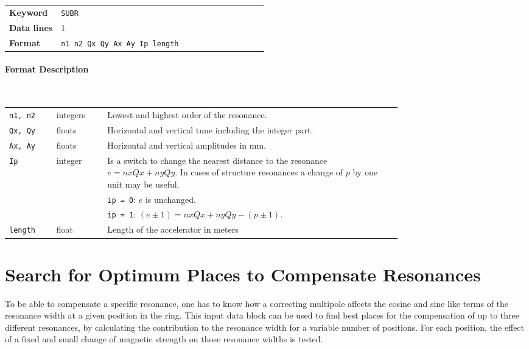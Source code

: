 \bigskip
\begin{tabular}{@{}lp{0.8\linewidth}}
    \textbf{Keyword}    & \texttt{SUBR} \\
    \textbf{Data lines} & 1 \\
    \textbf{Format}     & \texttt{n1 n2 Qx Qy Ax Ay Ip length}
\end{tabular}

\paragraph{Format Description}~

\bigskip
\begin{longtabu}{@{}llp{0.75\linewidth}}
    \texttt{n1, n2} & integers & Lowest and highest order of the resonance. \\
    \texttt{Qx, Qy} & floats   & Horizontal and vertical tune including the integer part. \\
    \texttt{Ax, Ay} & floats   & Horizontal and vertical amplitudes in mm. \\
    \texttt{Ip}     & integer  & Is a switch to change the nearest distance to the resonance \mbox{$e = nxQx + nyQy$.} In cases of structure resonances a change of $p$ by one unit may be useful. \\
                    &          & \texttt{ip = 0}: $e$ is unchanged. \\
                    &          & \texttt{ip = 1}: \mbox{$(e \pm 1) = nxQx + nyQy - (p \pm 1)$}. \\
    \texttt{length} & float    & Length of the accelerator in meters
\end{longtabu}

\section{Search for Optimum Places to Compensate Resonances} \label{SeaPla}

To be able to compensate a specific resonance, one has to know how a correcting multipole affects the cosine and sine like terms of the resonance width at a given position in the ring.
This input data block can be used to find best places for the compensation of up to three different resonances, by calculating the contribution to the resonance width for a variable number of positions.
For each position, the effect of a fixed and small change of magnetic strength on those resonance widths is tested.

